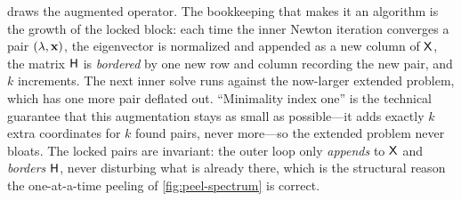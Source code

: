  draws the augmented operator. The bookkeeping that
makes it an algorithm is the growth of the locked block: each time the inner
Newton iteration converges a pair $(\lambda,\mathbf{x})$, the eigenvector is normalized
and appended as a new column of $\mathsf{X}$, the matrix $\mathsf{H}$ is \emph{bordered}
by one new row and column recording the new pair, and $k$ increments. The next
inner solve runs against the now-larger extended problem, which has one more pair
deflated out. ``Minimality index one'' is the technical guarantee that this
augmentation stays as small as possible---it adds exactly $k$ extra coordinates
for $k$ found pairs, never more---so the extended problem never bloats. The locked
pairs are invariant: the outer loop only \emph{appends} to $\mathsf{X}$ and
\emph{borders} $\mathsf{H}$, never disturbing what is already there, which is the
structural reason the one-at-a-time peeling of \cref{fig:peel-spectrum} is
correct.

